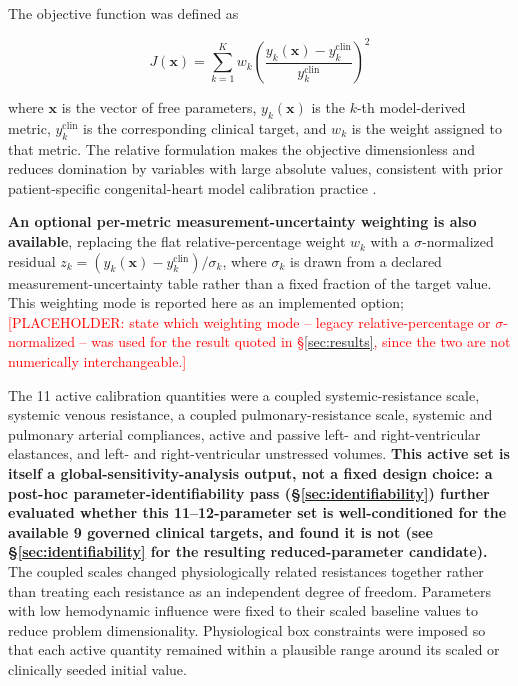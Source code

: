 \documentclass{article}
\begin{document}
The objective function was defined as

\begin{equation}
    J(\mathbf{x})
    = \sum_{k=1}^{K} w_k
      \left(
      \frac{y_k(\mathbf{x}) - y_k^{\mathrm{clin}}}{y_k^{\mathrm{clin}}}
      \right)^2
    \label{eq:objective}
\end{equation}

\noindent where $\mathbf{x}$ is the vector of free parameters, $y_k(\mathbf{x})$ is the $k$-th model-derived metric, $y_k^{\mathrm{clin}}$ is the corresponding clinical target, and $w_k$ is the weight assigned to that metric. The relative formulation makes the objective dimensionless and reduces domination by variables with large absolute values, consistent with prior patient-specific congenital-heart model calibration practice \cite{Schiavazzi2017,Ferrero2026Shunts}.

\textbf{An optional per-metric measurement-uncertainty weighting is also available}, replacing the flat relative-percentage weight $w_k$ with a $\sigma$-normalized residual $z_k = (y_k(\mathbf{x}) - y_k^{\mathrm{clin}})/\sigma_k$, where $\sigma_k$ is drawn from a declared measurement-uncertainty table rather than a fixed fraction of the target value. This weighting mode is reported here as an implemented option; \textcolor{red}{[PLACEHOLDER: state which weighting mode -- legacy relative-percentage or $\sigma$-normalized -- was used for the result quoted in \S\ref{sec:results}, since the two are not numerically interchangeable.]}

The 11 active calibration quantities were a coupled systemic-resistance scale, systemic venous resistance, a coupled pulmonary-resistance scale, systemic and pulmonary arterial compliances, active and passive left- and right-ventricular elastances, and left- and right-ventricular unstressed volumes. \textbf{This active set is itself a global-sensitivity-analysis output, not a fixed design choice: a post-hoc parameter-identifiability pass (\S\ref{sec:identifiability}) further evaluated whether this 11--12-parameter set is well-conditioned for the available 9 governed clinical targets, and found it is not (see \S\ref{sec:identifiability} for the resulting reduced-parameter candidate).} The coupled scales changed physiologically related resistances together rather than treating each resistance as an independent degree of freedom. Parameters with low hemodynamic influence were fixed to their scaled baseline values to reduce problem dimensionality. Physiological box constraints were imposed so that each active quantity remained within a plausible range around its scaled or clinically seeded initial value.
\end{document}
